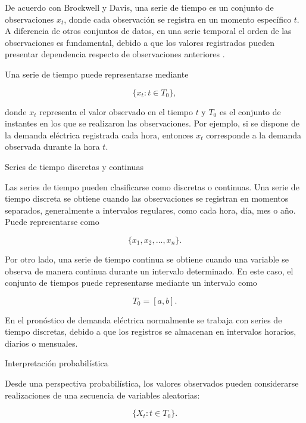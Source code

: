 De acuerdo con Brockwell y Davis, una serie de tiempo es un conjunto de observaciones $x_t$, donde cada observación se registra en un momento específico $t$. A diferencia de otros conjuntos de datos, en una serie temporal el orden de las observaciones es fundamental, debido a que los valores registrados pueden presentar dependencia respecto de observaciones anteriores \cite{brockwell2016introduction}.

Una serie de tiempo puede representarse mediante

\begin{equation}
    \{x_t:t\in T_0\},
\end{equation}

donde $x_t$ representa el valor observado en el tiempo $t$ y $T_0$ es el conjunto de instantes en los que se realizaron las observaciones. Por ejemplo, si se dispone de la demanda eléctrica registrada cada hora, entonces $x_t$ corresponde a la demanda observada durante la hora $t$.

Series de tiempo discretas y continuas

Las series de tiempo pueden clasificarse como discretas o continuas. Una serie de tiempo discreta se obtiene cuando las observaciones se registran en momentos separados, generalmente a intervalos regulares, como cada hora, día, mes o año. Puede representarse como

\begin{equation}
    \{x_1,x_2,\ldots,x_n\}.
\end{equation}

Por otro lado, una serie de tiempo continua se obtiene cuando una variable se observa de manera continua durante un intervalo determinado. En este caso, el conjunto de tiempos puede representarse mediante un intervalo como

\begin{equation}
    T_0=[a,b].
\end{equation}

En el pronóstico de demanda eléctrica normalmente se trabaja con series de tiempo discretas, debido a que los registros se almacenan en intervalos horarios, diarios o mensuales.

Interpretación probabilística

Desde una perspectiva probabilística, los valores observados pueden considerarse realizaciones de una secuencia de variables aleatorias:

\begin{equation}
    \{X_t:t\in T_0\}.
\end{equation}

